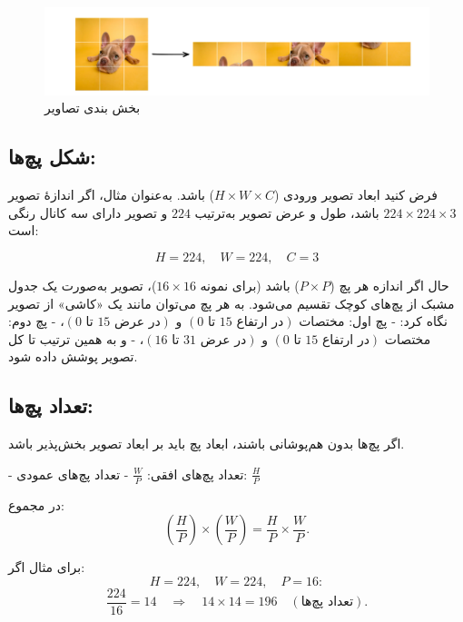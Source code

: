 \begin{figure}[h]
	\centering
	\begin{minipage}[b]{0.9\textwidth}
		\centering
		\includegraphics[width=\textwidth]{transformer_images/image_patch_embedding.png}
		\caption{بخش بندی تصاویر}
		\label{fig:image to patch in vision transformer}
	\end{minipage}
	\hfill
\end{figure}

\subsection{شکل پچ‌ها:}
فرض کنید ابعاد تصویر ورودی (\(H \times W \times C\)) باشد. به‌عنوان مثال، اگر اندازهٔ تصویر \(224 \times 224 \times 3\) باشد، طول و عرض تصویر به‌ترتیب \(224\) و تصویر دارای سه کانال رنگی است:

\[
H = 224, \quad W = 224, \quad C = 3
\]


حال اگر اندازه هر پچ (\(P \times P\)) باشد (برای نمونه \(16 \times 16\))، تصویر به‌صورت یک جدول مشبک از پچ‌های کوچک تقسیم می‌شود.  
به هر پچ می‌توان مانند یک «کاشی» از تصویر نگاه کرد:
- پچ اول: مختصات \((0 \text{ تا } 15 \text{ در ارتفاع}) \) و \((0 \text{ تا } 15 \text{ در عرض})\)،  
- پچ دوم: مختصات \((0 \text{ تا } 15 \text{ در ارتفاع}) \) و \((16 \text{ تا } 31 \text{ در عرض})\)،  
- و به همین ترتیب تا کل تصویر پوشش داده شود.



\subsection{تعداد پچ‌ها:}
اگر پچ‌ها بدون هم‌پوشانی باشند، ابعاد پچ باید بر ابعاد تصویر بخش‌پذیر باشد.  

- تعداد پچ‌های افقی: \(\frac{W}{P}\)  
- تعداد پچ‌های عمودی: \(\frac{H}{P}\)  

در مجموع:  
\begin{equation}
	\left(\frac{H}{P}\right) \times \left(\frac{W}{P}\right) = \frac{H}{P} \times \frac{W}{P}.
	\label{eq:grid_size}
\end{equation}


برای مثال اگر:
\[
H = 224, \quad W = 224, \quad P = 16:
\]
\[
\frac{224}{16} = 14 \quad \Rightarrow \quad 14 \times 14 = 196 \quad (\text{تعداد پچ‌ها}).
\]

